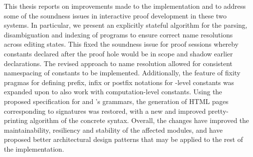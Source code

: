 This thesis reports on improvements made to the implementation \Beluga and \Harpoon to address some of the soundness issues in interactive proof development in these two systems.
In particular, we present an explicitly stateful algorithm for the parsing, disambiguation and indexing of \Beluga programs to ensure correct name resolutions across editing states.
This fixed the soundness issue for \Harpoon proof sessions whereby constants declared after the proof hole would be in scope and shadow earlier declarations.
The revised approach to name resolution allowed for consistent namespacing of constants to be implemented.
Additionally, the \Beluga feature of fixity pragmas for defining prefix, infix or postfix notations for \LF-level constants was expanded upon to also work with computation-level constants.
Using the proposed specification for \Beluga and \Harpoon's grammars, the generation of \textsc{HTML} pages corresponding to signatures was restored, with a new and improved pretty-printing algorithm of the concrete syntax.
Overall, the changes have improved the maintainability, resiliency and stability of the affected modules, and have proposed better architectural design patterns that may be applied to the rest of the implementation.













